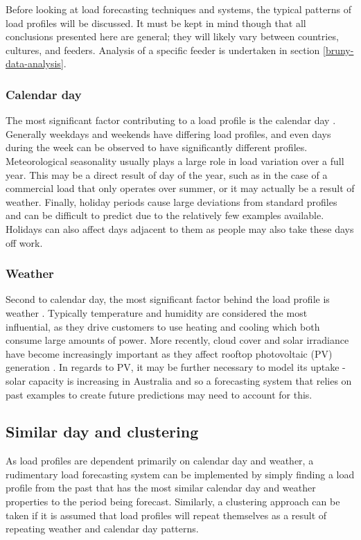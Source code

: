 Before looking at load forecasting techniques and systems, the typical patterns of load profiles will be discussed.
It must be kept in mind though that all conclusions presented here are general; they will likely vary between countries, cultures, and feeders.
Analysis of a specific feeder is undertaken in section \ref{bruny-data-analysis}.

\subsubsection{Calendar day}
The most significant factor contributing to a load profile is the calendar day \citep{Weron2006}.
Generally weekdays and weekends have differing load profiles, and even days during the week can be observed to have significantly different profiles.
Meteorological seasonality usually plays a large role in load variation over a full year.
This may be a direct result of day of the year, such as in the case of a commercial load that only operates over summer, or it may actually be a result of weather.
Finally, holiday periods cause large deviations from standard profiles and can be difficult to predict due to the relatively few examples available.
Holidays can also affect days adjacent to them as people may also take these days off work.

\subsubsection{Weather}
Second to calendar day, the most significant factor behind the load profile is weather \citep{Hippert2001}.
Typically temperature and humidity are considered the most influential, as they drive customers to use heating and cooling which both consume large amounts of power.
More recently, cloud cover and solar irradiance have become increasingly important as they affect rooftop photovoltaic (PV) generation \cite{AEMO2017}.
In regards to PV, it may be further necessary to model its uptake - solar capacity is increasing in Australia \citep{Jacobs2017} and so a forecasting system that relies on past examples to create future predictions may need to account for this.

\subsection{Similar day and clustering}
As load profiles are dependent primarily on calendar day and weather, a rudimentary load forecasting system can be implemented by simply finding a load profile from the past that has the most similar calendar day and weather properties to the period being forecast. 
Similarly, a clustering approach can be taken if it is assumed that load profiles will repeat themselves as a result of repeating weather and calendar day patterns.

